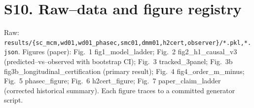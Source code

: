 \documentclass[11pt]{article}
\begin{document}
\section{S10. Raw--data and figure registry}
Raw: \texttt{results/\{sc\_mcm,wd01,wd01\_phasec,smc01,dmm01,h2cert,observer\}/*.pkl,*.json}. Figures (paper):
Fig.~1 fig1\_model\_ladder; Fig.~2 fig2\_h1\_causal\_v3 (predicted--vs--observed with bootstrap CI);
Fig.~3 tracked\_3panel; Fig.~3b fig3b\_longitudinal\_certification (primary result);
Fig.~4 fig4\_order\_m\_minus; Fig.~5 phasec\_figure; Fig.~6 h2cert\_figure; Fig.~7 paper\_claim\_ladder
(corrected historical summary). Each figure traces to a committed generator script.
\end{document}
